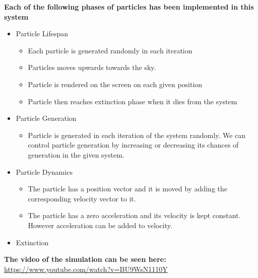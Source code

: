 \documentclass{article}
\begin{document}
\textbf{Each of the following phases of particles has been implemented in this system}
\begin{itemize}
    \item Particle Lifespan
    \begin{itemize}
      \item{Each particle is generated randomly in each iteration}
      \item{Particles moves upwards towards the sky.}
      \item{Particle is rendered on the screen on each given position}
      \item{Particle then reaches extinction phase when it dies from the system}
    \end{itemize}
    \item Particle Generation
    \begin{itemize}
      \item{Particle is generated in each iteration of the system randomly. We can control particle generation by increasing or decreasing its chances of generation in the given system.}
    \end{itemize}
    \item Particle Dynamics
    \begin{itemize}
      \item{The particle has a position vector and it is moved by adding the corresponding velocity vector to it.}
      \item{The particle has a zero acceleration and its velocity is kept constant. However acceleration can be added to velocity.}
    \end{itemize}
    \item Extinction
\end{itemize}

\textbf{The video of the simulation can be seen here: }
\href{https://www.youtube.com/watch?v=BU9WsN1110Y}{https://www.youtube.com/watch?v=BU9WsN1110Y}
\end{document}

